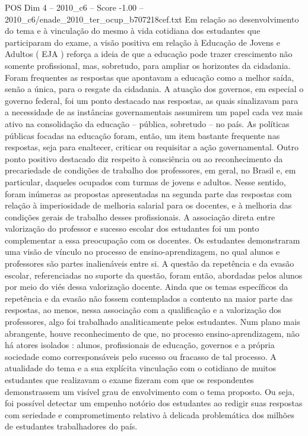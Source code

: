 \begin{textsample}{POS Dim 4 – 2010\_c6 – Score -1.00 – 2010\_c6/enade\_2010\_ter\_ocup\_b707218cef.txt}
Em relação ao desenvolvimento do tema e à vinculação do mesmo à vida cotidiana dos estudantes que participaram do exame, a visão positiva em relação à Educação de Jovens e Adultos ( EJA ) reforça a ideia de que a educação pode trazer crescimento não somente profissional, mas, sobretudo, para ampliar os horizontes da cidadania.
Foram frequentes as respostas que apontavam a educação como a melhor saída, senão a única, para o resgate da cidadania.
A atuação dos governos, em especial o governo federal, foi um ponto destacado nas respostas, as quais sinalizavam para a necessidade de as instâncias governamentais assumirem um papel cada vez mais ativo na consolidação da educação – pública, sobretudo – no país.
As políticas públicas focadas na educação foram, então, um item bastante frequente nas respostas, seja para enaltecer, criticar ou requisitar a ação governamental.
Outro ponto positivo destacado diz respeito à consciência ou ao reconhecimento da precariedade de condições de trabalho dos professores, em geral, no Brasil e, em particular, daqueles ocupados com turmas de jovens e adultos.
Nesse sentido, foram inúmeras as propostas apresentadas na segunda parte das respostas com relação à imperiosidade de melhoria salarial para os docentes, e à melhoria das condições gerais de trabalho desses profissionais.
A associação direta entre valorização do professor e sucesso escolar dos estudantes foi um ponto complementar a essa preocupação com os docentes.
Os estudantes demonstraram uma visão de vínculo no processo de ensino-aprendizagem, no qual alunos e professores são partes inalienáveis entre si.
A questão da repetência e da evasão escolar, referenciadas no suporte da questão, foram então, abordadas pelos alunos por meio do viés dessa valorização docente.
Ainda que os temas específicos da repetência e da evasão não fossem contemplados a contento na maior parte das respostas, ao menos, nessa associação com a qualificação e a valorização dos professores, algo foi trabalhado analiticamente pelos estudantes.
Num plano mais abrangente, houve reconhecimento de que, no processo ensino-aprendizagem, não há atores isolados : alunos, profissionais de educação, governos e a própria sociedade como corresponsáveis pelo sucesso ou fracasso de tal processo.
A atualidade do tema e a sua explícita vinculação com o cotidiano de muitos estudantes que realizavam o exame fizeram com que os respondentes demonstrassem um visível grau de envolvimento com o tema proposto.
Ou seja, foi possível detectar um empenho notório dos estudantes ao redigir suas respostas com seriedade e comprometimento relativo à delicada problemática dos milhões de estudantes trabalhadores do país.

\end{textsample}
